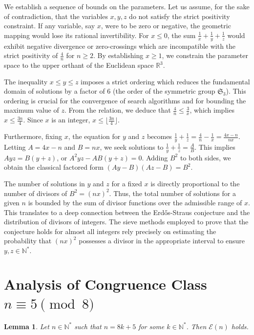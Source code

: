 \documentclass[12pt, a4paper]{article}
\newtheorem{lemma}[theorem]{Lemma}
\theoremstyle{definition}
\theoremstyle{remark}
\begin{document}
We establish a sequence of bounds on the parameters. Let us assume, for the sake of contradiction, that the variables $x, y, z$ do not satisfy the strict positivity constraint. If any variable, say $x$, were to be zero or negative, the geometric mapping would lose its rational invertibility. For $x \le 0$, the sum $\frac{1}{x} + \frac{1}{y} + \frac{1}{z}$ would exhibit negative divergence or zero-crossings which are incompatible with the strict positivity of $\frac{4}{n}$ for $n \ge 2$. By establishing $x \ge 1$, we constrain the parameter space to the upper orthant of the Euclidean space $\mathbb{R}^3$.

The inequality $x \le y \le z$ imposes a strict ordering which reduces the fundamental domain of solutions by a factor of 6 (the order of the symmetric group $\mathfrak{S}_3$). This ordering is crucial for the convergence of search algorithms and for bounding the maximum value of $z$. From the relation, we deduce that $\frac{4}{n} \le \frac{3}{x}$, which implies $x \le \frac{3n}{4}$. Since $x$ is an integer, $x \le \lfloor \frac{3n}{4} \rfloor$.

Furthermore, fixing $x$, the equation for $y$ and $z$ becomes $\frac{1}{y} + \frac{1}{z} = \frac{4}{n} - \frac{1}{x} = \frac{4x - n}{nx}$. Letting $A = 4x - n$ and $B = nx$, we seek solutions to $\frac{1}{y} + \frac{1}{z} = \frac{A}{B}$. This implies $Ayz = B(y+z)$, or $A^2 y z - AB(y+z) = 0$. Adding $B^2$ to both sides, we obtain the classical factored form $(Ay - B)(Az - B) = B^2$.

The number of solutions in $y$ and $z$ for a fixed $x$ is directly proportional to the number of divisors of $B^2 = (nx)^2$. Thus, the total number of solutions for a given $n$ is bounded by the sum of divisor functions over the admissible range of $x$. This translates to a deep connection between the Erd\H{o}s-Straus conjecture and the distribution of divisors of integers. The sieve methods employed to prove that the conjecture holds for almost all integers rely precisely on estimating the probability that $(nx)^2$ possesses a divisor in the appropriate interval to ensure $y, z \in \mathbb{N}^*$.

\section{Analysis of Congruence Class $n \equiv 5 \pmod 8$}

\begin{lemma}
Let $n \in \mathbb{N}^*$ such that $n = 8k + 5$ for some $k \in \mathbb{N}^*$. Then $\mathcal{E}(n)$ holds.
\end{lemma}
\end{document}
